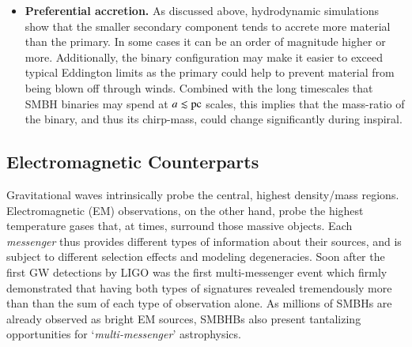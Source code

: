 \documentclass[onecolumn,authoryear]{els-mrw}
\begin{document}
\begin{itemize}
    \item \textbf{Preferential accretion.}  As discussed above, hydrodynamic simulations show that the smaller secondary component tends to accrete more material than the primary.  In some cases it can be an order of magnitude higher or more.  Additionally, the binary configuration may make it easier to exceed typical Eddington limits as the primary could help to prevent material from being blown off through winds.  Combined with the long timescales that SMBH binaries may spend at $a \lesssim \mathrm{pc}$ scales, this implies that the mass-ratio of the binary, and thus its chirp-mass, could change significantly during inspiral.
\end{itemize}

\subsection{Electromagnetic Counterparts}\label{sec:ems}


Gravitational waves intrinsically probe the central, highest density/mass regions.  Electromagnetic (EM) observations, on the other hand, probe the highest temperature gases that, at times, surround those massive objects.  Each \textit{messenger} thus provides different types of information about their sources, and is subject to different selection effects and modeling degeneracies.  Soon after the first GW detections by LIGO was the first multi-messenger event which firmly demonstrated that having both types of signatures revealed tremendously more than than the sum of each type of observation alone.  As millions of SMBHs are already observed as bright EM sources, SMBHBs also present tantalizing opportunities for `\textit{multi-messenger}' astrophysics.
\end{document}
